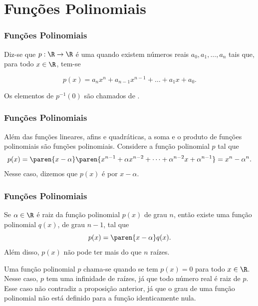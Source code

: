 \section{Funções Polinomiais}
\begin{frame}
    \frametitle{Funções Polinomiais} 
    
    \begin{definicao}
    Diz-se que $p: \R \to \R$ é uma  quando
    existem números reais $a_0, a_1, \dots , a_n$ tais que, para todo $x
    \in \R$, tem-se
    
    \begin{equation}\label{funcpol}
    p(x) = a_n x^n + a_{n-1} x^{n-1} + \dots + a_1 x + a_0.
    \end{equation}
    
    Os elementos de $p^{-1}(0)$ são chamados de .
    \end{definicao}
    
    \end{frame}
    
    
    
    
    \begin{frame}
    \frametitle{Funções Polinomiais} 
    
    \begin{exemplo}
    Além das funções lineares, afins e quadráticas, a soma e o produto
    de funções polinomiais são funções polinomiais. Considere a função
    polinomial $p$ tal que $$p(x) = \paren{x - \alpha} \paren{x^{n-1} +
    \alpha x^{n-2} + \dots + \alpha^{n-2}x+ \alpha^{n-1}}=x^n -
    \alpha^n.$$ Nesse caso, dizemos que $p(x)$ é  por $x-
    \alpha$.
    \end{exemplo}
    
    \end{frame}
    
    
    
    
    \begin{frame}
    \frametitle{Funções Polinomiais} 
    \begin{proposicao}
    Se $\alpha \in \R$ é raiz da função polinomial $p(x)$ de grau $n$,
    então existe uma função polinomial $q(x)$, de grau $n-1$, tal que
    $$p(x) = \paren{x- \alpha}q(x).$$
    Além disso, $p(x)$ não pode ter mais do que $n$ raízes.
    \end{proposicao}\pause
    
    Uma função polinomial $p$ chama-se  quando
    se tem $p(x) = 0$ para todo $x \in \R$. Nesse caso, $p$ tem uma
    infinidade de raízes, já que todo número real é raiz de $p$. Esse
    caso não contradiz a proposição anterior, já que o grau de uma
    função polinomial não está definido para a função identicamente
    nula.
    
    \end{frame}
    
